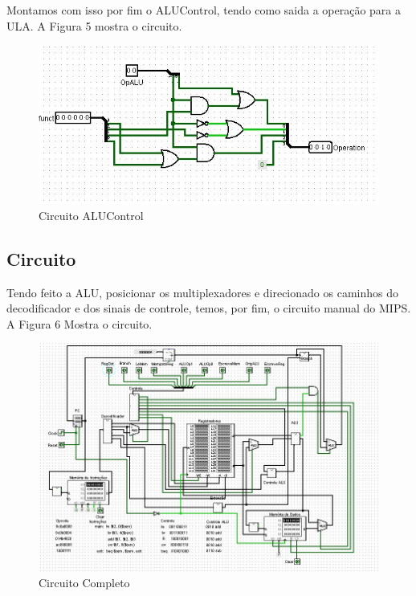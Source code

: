 \documentclass[
	article,
	11pt,
	oneside,
	a4paper,
	english,
	brazil,
	]{abntex2}
\begin{document}
Montamos com isso por fim o ALUControl, tendo como saida a operação para a ULA. A Figura 5 mostra o circuito.

        \begin{figure}[!htb]
        \centering
        \includegraphics[scale=0.5]{imagens/ALUControl.JPG}
        \caption{Circuito ALUControl}
        \label{fig:hostnetid}
        \end{figure}

\subsection{Circuito}

Tendo feito a ALU, posicionar os multiplexadores e direcionado os caminhos do decodificador e dos sinais de controle, temos, por fim, o circuito manual do MIPS. A Figura 6 Mostra o circuito.


        \begin{figure}[!htb]
        \centering
        \includegraphics[scale=0.5]{imagens/circuito.JPG}
        \caption{Circuito Completo}
        \label{fig:hostnetid}
        \end{figure}
\end{document}
